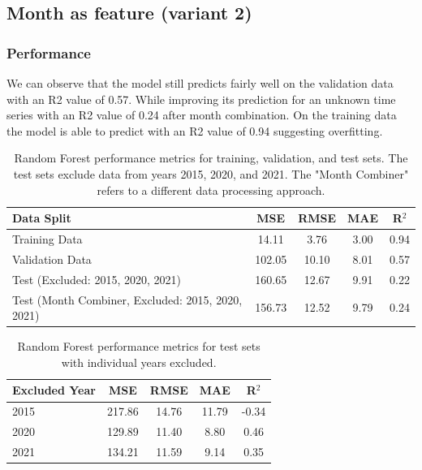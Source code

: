 \documentclass{article}
\begin{document}
\subsection{Month as feature (variant 2)}
\subsubsection{Performance}
We can observe that the model still predicts fairly well on the validation data with an R2 value of 0.57. While improving its prediction for an unknown time series with an R2 value of 0.24 after month combination.
On the training data the model is able to predict with an R2 value of 0.94 suggesting overfitting.
\begin{table}[H]
	\centering
	\begin{tabular}{lcccc}
		\hline
		Data Split                                        & MSE    & RMSE  & MAE  & R$^2$ \\
		\hline
		Training Data                                     & 14.11  & 3.76  & 3.00 & 0.94  \\
		Validation Data                                   & 102.05 & 10.10 & 8.01 & 0.57  \\
		Test (Excluded: 2015, 2020, 2021)                 & 160.65 & 12.67 & 9.91 & 0.22  \\
		Test (Month Combiner, Excluded: 2015, 2020, 2021) & 156.73 & 12.52 & 9.79 & 0.24  \\
		\hline
	\end{tabular}
	\caption{Random Forest performance metrics for training, validation, and test sets. The test sets exclude data from years 2015, 2020, and 2021. The "Month Combiner" refers to a different data processing approach.}
\end{table}
\begin{table}[H]
	\centering
	\begin{tabular}{lcccc}
		\hline
		Excluded Year & MSE    & RMSE  & MAE   & R$^2$ \\
		\hline
		2015          & 217.86 & 14.76 & 11.79 & -0.34 \\
		2020          & 129.89 & 11.40 & 8.80  & 0.46  \\
		2021          & 134.21 & 11.59 & 9.14  & 0.35  \\
		\hline
	\end{tabular}
	\caption{Random Forest performance metrics for test sets with individual years excluded.}
\end{table}
\end{document}
